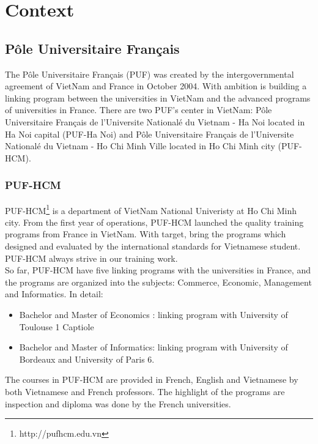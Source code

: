 \chapter{Context}
\section{P\^{o}le Universitaire Fran\c{c}ais}
The P\^{o}le Universitaire Fran\c{c}ais (PUF) was created by the intergovernmental agreement of VietNam and France in October 2004. With ambition is building a linking program between the universities in VietNam and the advanced programs of universities in France. There are two PUF's center in VietNam: P\^{o}le Universitaire Fran\c{c}ais de l'Universite National\'{e} du Vietnam - Ha Noi located in Ha Noi capital (PUF-Ha Noi) and P\^{o}le Universitaire Fran\c{c}ais de l'Universite National\'{e} du Vietnam - Ho Chi Minh Ville located in Ho Chi Minh city (PUF-HCM).

\subsection*{PUF-HCM}
PUF-HCM\footnote{http://pufhcm.edu.vn} is a department of VietNam National Univeristy at Ho Chi Minh city. From the first year of operations, PUF-HCM launched the quality training programs from France in VietNam. With target, bring the programs which designed and evaluated by the international standards for Vietnamese student. PUF-HCM always strive in our training work.\\
So far, PUF-HCM have five linking programs with the universities in France, and the programs are organized into the subjects: Commerce, Economic, Management and Informatics. In detail:
\begin{itemize}
\item Bachelor and Master of Economics : linking program with University of Toulouse 1 Captiole
\item Bachelor and Master of Informatics: linking program with University of Bordeaux and University of Paris 6.
\end{itemize}
The courses in PUF-HCM are provided in French, English and Vietnamese by both Vietnamese and French professors. The highlight of the programs are inspection and diploma was done by the French universities.
